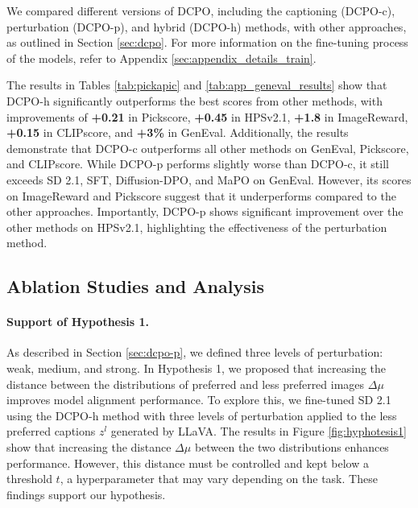 We compared different versions of DCPO, including the captioning (DCPO-c), perturbation (DCPO-p), and hybrid (DCPO-h) methods, with other approaches, as outlined in Section \ref{sec:dcpo}. For more information on the fine-tuning process of the models, refer to Appendix \ref{sec:appendix_details_train}.

The results in Tables \ref{tab:pickapic} and \ref{tab:app_geneval_results} show that DCPO-h significantly outperforms the best scores from other methods, with improvements of \textbf{+0.21} in Pickscore, \textbf{+0.45} in HPSv2.1, \textbf{+1.8} in ImageReward, \textbf{+0.15} in CLIPscore, and\textbf{ +3\%} in GenEval. Additionally, the results demonstrate that DCPO-c outperforms all other methods on GenEval, Pickscore, and CLIPscore. While DCPO-p performs slightly worse than DCPO-c, it still exceeds SD 2.1, SFT, Diffusion-DPO, and MaPO on GenEval. However, its scores on ImageReward and Pickscore suggest that it underperforms compared to the other approaches. Importantly, DCPO-p shows significant improvement over the other methods on HPSv2.1, highlighting the effectiveness of the perturbation method.



\subsection{Ablation Studies and Analysis}



\label{fig:dcpo-p}


\label{sec:ablation}



\paragraph{Support of Hypothesis 1.} As described in Section \ref{sec:dcpo-p}, we defined three levels of perturbation: weak, medium, and strong. In Hypothesis 1, we proposed that increasing the distance between the distributions of preferred and less preferred images  \( \Delta \mu \) improves model alignment performance. To explore this, we fine-tuned SD 2.1 using the DCPO-h method with three levels of perturbation applied to the less preferred captions \(z^l\) generated by LLaVA. The results in Figure \ref{fig:hyphotesis1} show that increasing the distance \( \Delta \mu \) between the two distributions enhances performance. However, this distance must be controlled and kept below a threshold \( t \), a hyperparameter that may vary depending on the task. These findings support our hypothesis.

